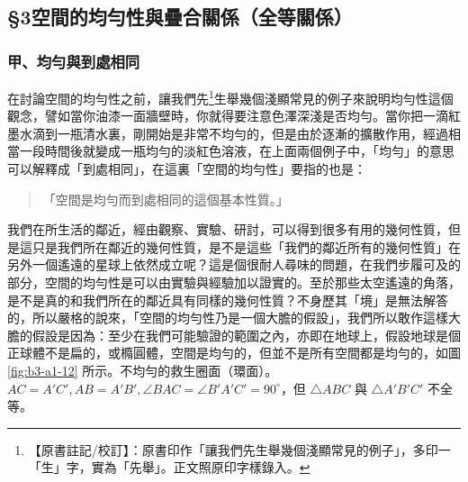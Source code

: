 \subsection*{\S 3\quad 空間的均勻性與疊合關係（全等關係）}
\label{sec:b3_a1_3}

\subsubsection*{甲、均勻與到處相同}

在討論空間的均勻性之前，讓我們先\label{note:b3-a1-p268-xian}\footnote{【原書註記/校訂】：原書印作「讓我們先生舉幾個淺顯常見的例子」，多印一「生」字，實為「先舉」。正文照原印字樣錄入。}生舉幾個淺顯常見的例子來說明均勻性這個觀念，譬如當你油漆一面牆壁時，你就得要注意色澤深淺是否均勻。當你把一滴紅墨水滴到一瓶清水裏，剛開始是非常不均勻的，但是由於逐漸的擴散作用，經過相當一段時間後就變成一瓶均勻的淡紅色溶液，在上面兩個例子中，「均勻」的意思可以解釋成「到處相同」，在這裏「空間的均勻性」要指的也是：
\begin{quote}
  「空間是均勻而到處相同的這個基本性質。」
\end{quote}

我們在所生活的鄰近，經由觀察、實驗、研討，可以得到很多有用的幾何性質，但是這只是我們所在鄰近的幾何性質，是不是這些「我們的鄰近所有的幾何性質」在另外一個遙遠的星球上依然成立呢？這是個很耐人尋味的問題，在我們步履可及的部分，空間的均勻性是可以由實驗與經驗加以證實的。至於那些太空遙遠的角落，是不是真的和我們所在的鄰近具有同樣的幾何性質？不身歷其「境」是無法解答的，所以嚴格的說來，「空間的均勻性乃是一個大膽的假設」，我們所以敢作這樣大膽的假設是因為：至少在我們可能驗證的範圍之內，亦即在地球上，假設地球是個正球體不是扁的，或橢圓體，空間是均勻的，但並不是所有空間都是均勻的，如圖 \ref{fig:b3-a1-12} 所示。不均勻的救生圈面（環面）。$AC = A'C', AB = A'B', \angle BAC = \angle B'A'C' = 90^\circ$，但 $\triangle ABC$ 與 $\triangle A'B'C'$ 不全等。


